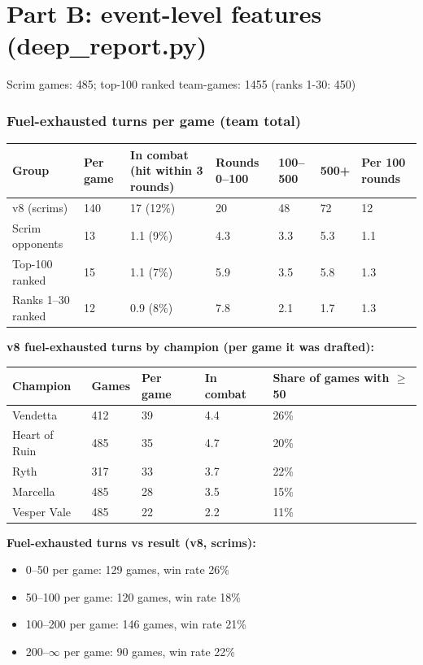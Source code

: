 \documentclass[
  10pt,
]{article}
\newcounter{none} %
\providecommand{\tightlist}{%
  \setlength{\itemsep}{0pt}\setlength{\parskip}{0pt}}
\begin{document}
\section{Part B: event-level features
(deep\_report.py)}\label{part-b-event-level-features-deep_reportpy}

Scrim games: 485; top-100 ranked team-games: 1455 (ranks 1-30: 450)

\subsubsection{Fuel-exhausted turns per game (team
total)}\label{fuel-exhausted-turns-per-game-team-total}

{\def\LTcaptype{none} %
\begin{longtable}[]{@{}lllllll@{}}
\toprule\noalign{}
Group & Per game & In combat (hit within 3 rounds) & Rounds 0--100 &
100--500 & 500+ & Per 100 rounds \\
\midrule\noalign{}
\endhead
\bottomrule\noalign{}
\endlastfoot
v8 (scrims) & 140 & 17 (12\%) & 20 & 48 & 72 & 12 \\
Scrim opponents & 13 & 1.1 (9\%) & 4.3 & 3.3 & 5.3 & 1.1 \\
Top-100 ranked & 15 & 1.1 (7\%) & 5.9 & 3.5 & 5.8 & 1.3 \\
Ranks 1--30 ranked & 12 & 0.9 (8\%) & 7.8 & 2.1 & 1.7 & 1.3 \\
\end{longtable}
}

\textbf{v8 fuel-exhausted turns by champion (per game it was drafted):}

{\def\LTcaptype{none} %
\begin{longtable}[]{@{}lllll@{}}
\toprule\noalign{}
Champion & Games & Per game & In combat & Share of games with $\geq$50 \\
\midrule\noalign{}
\endhead
\bottomrule\noalign{}
\endlastfoot
Vendetta & 412 & 39 & 4.4 & 26\% \\
Heart of Ruin & 485 & 35 & 4.7 & 20\% \\
Ryth & 317 & 33 & 3.7 & 22\% \\
Marcella & 485 & 28 & 3.5 & 15\% \\
Vesper Vale & 485 & 22 & 2.2 & 11\% \\
\end{longtable}
}

\textbf{Fuel-exhausted turns vs result (v8, scrims):}

\begin{itemize}
\tightlist
\item
  0--50 per game: 129 games, win rate 26\%
\item
  50--100 per game: 120 games, win rate 18\%
\item
  100--200 per game: 146 games, win rate 21\%
\item
  200--$\infty$ per game: 90 games, win rate 22\%
\end{itemize}
\end{document}
